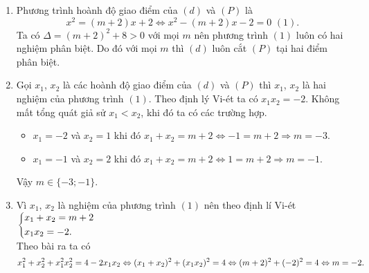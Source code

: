 \begin{bt}
{\begin{enumerate}
			\item 
			Phương trình hoành độ giao điểm của $(d)$ và $(P)$ là
			$$ x^2=(m+2)x+2 \Leftrightarrow x^2-(m+2)x-2=0 \,\,(1).$$
			Ta có $\Delta = (m+2)^2+8 >0$ với mọi $m$ nên phương trình $(1)$ luôn có hai nghiệm phân biệt. Do đó với mọi $m$ thì $(d)$ luôn cắt $(P)$ tại hai điểm phân biệt.
			\item 
			Gọi $x_1$, $x_2$ là  các hoành độ giao điểm của $(d)$ và $(P)$ thì  $x_1$, $x_2$ là hai nghiệm của phương trình $(1)$. Theo định lý Vi-ét ta có $x_1  x_2 =-2$. Không mất tổng quát giả sử $x_1 <x_2$, khi đó ta có các trường hợp. 
			\begin{itemize}
				\item $x_1=-2$ và $x_2=1$ khi đó $x_1+x_2=m+2\Leftrightarrow -1=m+2 \Rightarrow m=-3$. 
				\item $x_1=-1$ và $x_2=2$ khi đó $x_1+x_2=m+2\Leftrightarrow 1=m+2 \Rightarrow m=-1$.
			\end{itemize}
			Vậy $m\in \{-3; -1\}$.
			\item
			Vì $x_1$, $x_2$ là nghiệm của phương trình $(1)$ nên theo định lí Vi-ét $\left\{\begin{aligned}&x_1+x_2=m+2\\&x_1 x_2=-2.\end{aligned}\right.$\\
			Theo bài ra ta có 
			$$x_1^2+x_2^2 +x_1^2x_2^2=4-2x_1x_2\\
			\Leftrightarrow (x_1+x_2)^2+(x_1x_2)^2=4\\
			\Leftrightarrow (m+2)^2+(-2)^2=4\\
			\Leftrightarrow m=-2. $$
			
		\end{enumerate}
	}
\end{bt}
